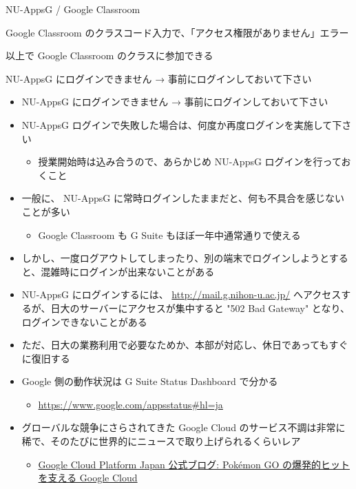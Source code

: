 \documentclass[a4j,10pt]{jsarticle}
\begin{document}
{\begin{frame}[label={sec:org25495ab},fragile]{NU-AppsG / Google Classroom}
\begin{block}{Google Classroom のクラスコード入力で、「アクセス権限がありません」エラー}
\begin{enumerate}
\end{enumerate}
\par
以上で Google Classroom のクラスに参加できる
\end{block}
\par
\begin{block}{NU-AppsG にログインできません → 事前にログインしておいて下さい}
\begin{itemize}
\item NU-AppsG にログインできません → 事前にログインしておいて下さい
\par
\item NU-AppsG ログインで失敗した場合は、何度か再度ログインを実施して下さい
\begin{itemize}
\item 授業開始時は込み合うので、あらかじめ NU-AppsG ログインを行っておくこと
\end{itemize}
\par
\item 一般に、 NU-AppsG に常時ログインしたままだと、何も不具合を感じないことが多い
\begin{itemize}
\item Google Classroom も G Suite もほぼ一年中通常通りで使える
\end{itemize}
\par
\item しかし、一度ログアウトしてしまったり、別の端末でログインしようとすると、混雑時にログインが出来ないことがある
\par
\item NU-AppsG にログインするには、
\url{http://mail.g.nihon-u.ac.jp/}
へアクセスするが、日大のサーバーにアクセスが集中すると "502 Bad Gateway" となり、ログインできないことがある
\par
\item ただ、日大の業務利用で必要なためか、本部が対応し、休日であってもすぐに復旧する
\item Google 側の動作状況は G Suite Status Dashboard で分かる
\begin{itemize}
\item \url{https://www.google.com/appsstatus\#hl=ja}
\end{itemize}
\par
\item グローバルな競争にさらされてきた Google Cloud のサービス不調は非常に稀で、そのたびに世界的にニュースで取り上げられるくらいレア
\begin{itemize}
\item \href{https://cloudplatform-jp.googleblog.com/2016/10/pokemon-go-google-cloud.html}{Google Cloud Platform Japan 公式ブログ: Pokémon GO の爆発的ヒットを支える Google Cloud}

\end{itemize}
\end{itemize}
\end{block}
\end{frame}}
\end{document}
